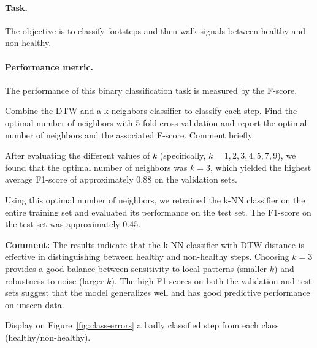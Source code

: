\documentclass[11pt]{article}
\begin{document}
\paragraph{Task.} The objective is to classify footsteps and then walk signals between healthy and non-healthy.

\paragraph{Performance metric.} The performance of this binary classification task is measured by the F-score.


\begin{exercise}
Combine the DTW and a k-neighbors classifier to classify each step. Find the optimal number of neighbors with 5-fold cross-validation and report the optimal number of neighbors and the associated F-score. Comment briefly.
\end{exercise}

\begin{solution} %
    After evaluating the different values of \( k \) (specifically, \( k = 1, 2, 3, 4, 5, 7, 9 \)), we found that the optimal number of neighbors was \( k = 3 \), which yielded the highest average F1-score of approximately \( 0.88 \) on the validation sets.
    
    Using this optimal number of neighbors, we retrained the k-NN classifier on the entire training set and evaluated its performance on the test set. The F1-score on the test set was approximately \( 0.45 \).
    
    \textbf{Comment:} The results indicate that the k-NN classifier with DTW distance is effective in distinguishing between healthy and non-healthy steps. Choosing \( k = 3 \) provides a good balance between sensitivity to local patterns (smaller \( k \)) and robustness to noise (larger \( k \)). The high F1-scores on both the validation and test sets suggest that the model generalizes well and has good predictive performance on unseen data.
    
\end{solution}

\newpage
\begin{exercise}\label{q:class-errors}
Display on Figure~\ref{fig:class-errors} a badly classified step from each class (healthy/non-healthy).
\end{exercise}
\end{document}
